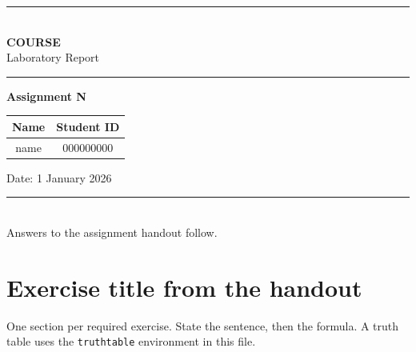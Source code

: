 \documentclass[11pt,a4paper]{article}
\newcommand{\coursenum}{COURSE}
\newcommand{\labnum}{N}
\newcommand{\reportdate}{1 January 2026}
\newcommand{\studentname}{name}
\newcommand{\studentid}{000000000}
\begin{document}
\hypersetup{pageanchor=false}
\thispagestyle{empty}
\color{ink}

\begin{titlepage}
\centering
\vspace*{1.15cm}

{\color{heading}\rule{\textwidth}{1.15pt}}\\[0.55em]
{\Large\bfseries\color{heading} \coursenum}\\[0.35em]
{\large Laboratory Report}\\[0.45em]
{\color{heading}\rule{\textwidth}{0.45pt}}

\vspace{1.5cm}

{\LARGE\bfseries\color{heading} Assignment \labnum}

\vspace{1.6cm}

\renewcommand{\arraystretch}{1.32}
\begin{tabular}{@{}cc@{}}
\toprule
\rowcolor{rowalt}
\textbf{\color{heading} Name} &
\textbf{\color{heading} Student ID} \\
\midrule
\studentname & \studentid \\
\bottomrule
\end{tabular}

\vspace{0.85em}
{\large Date: \reportdate}

\vfill

{\color{heading}\rule{\textwidth}{0.45pt}}\\[0.4em]
{\small\color{heading}
Answers to the assignment handout follow.}
\end{titlepage}

\hypersetup{pageanchor=true}
\pagestyle{fancy}
\tableofcontents
\newpage

\section{Exercise title from the handout}

One section per required exercise. State the sentence, then the formula.
A truth table uses the \texttt{truthtable} environment in this file.
\end{document}
